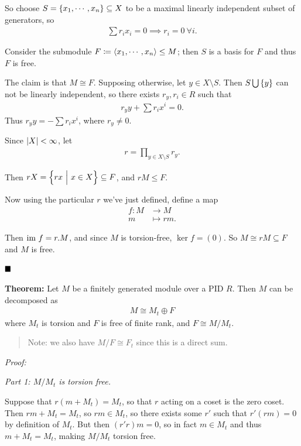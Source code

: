 So choose \(S = \left\{{x_1, \cdots , x_n}\right\} \subseteq X\) to be a maximal
linearly independent subset of generators, so
\begin{align*}
\sum r_i x_i = 0 \implies r_i = 0 ~\forall i
.\end{align*}

Consider the submodule
\(F \coloneqq \left\langle{x_1, \cdots, x_n}\right\rangle \leq M\); then \(S\) is a
basis for \(F\) and thus \(F\) is free.

The claim is that \(M \cong F\). Supposing otherwise, let
\(y\in X\setminus S\). Then \(S \bigcup \left\{{y}\right\}\) can not be linearly
independent, so there exists \(r_y, r_i \in R\) such that
\begin{align*}
r_y y + \sum r_i x^i = 0
.\end{align*} Thus \(r_y y = - \sum r_i x^i\), where \(r_y \neq 0\).

Since \({\left\lvert {X} \right\rvert} < \infty\), let
\begin{align*}
r = \prod_{y \in X\setminus S} r_y
.\end{align*}

Then \(rX = \left\{{rx {~\mathrel{\Big|}~} x\in X}\right\} \subseteq F\), and
\(rM \leq F\).

Now using the particular \(r\) we've just defined, define a map
\begin{align*}
f: M &\to M \\
m &\mapsto rm
.\end{align*}

Then \({\text{im}~} f = r.M\), and since \(M\) is torsion-free, \(\ker f = (0)\).
So \(M \cong rM \subseteq F\) and \(M\) is free.

\(\qed\)

\textbf{Theorem:} Let \(M\) be a finitely generated module over a PID
\(R\). Then \(M\) can be decomposed as
\begin{align*}
M \cong M_t \oplus F
\end{align*} where \(M_t\) is torsion and \(F\) is free of finite rank,
and \(F \cong M/M_t\).

\begin{quote}
Note: we also have \(M/F \cong F_t\) since this is a direct sum.
\end{quote}

\emph{Proof:}

\emph{Part 1: \(M/M_t\) is torsion free.}

Suppose that \(r(m + M_t) = M_t\), so that \(r\) acting on a coset is
the zero coset. Then \(rm + M_t = M_t\), so \(rm \in M_t\), so there
exists some \(r'\) such that \(r'(rm) = 0\) by definition of \(M_t\).
But then \((r'r)m = 0\), so in fact \(m\in M_t\) and thus
\(m + M_t = M_t\), making \(M/M_t\) torsion free.

